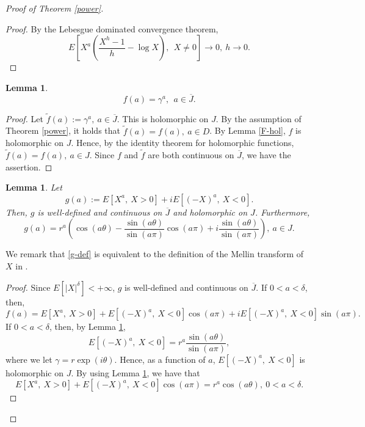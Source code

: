 \documentclass[a4paper, reqno, 11pt]{amsart}
\newtheorem{Lem}[Thm]{Lemma}
\theoremstyle{definition}
\begin{document}
\begin{proof}[Proof of Theorem \ref{power}]
\begin{proof}
By the Lebesgue dominated convergence theorem, %
\[ E\left[X^a \left( \frac{X^h - 1}{h} - \log X \right), \ \  X \ne 0 \right] \to 0, \ h \to 0. \]
\end{proof}

\begin{Lem}\label{F-rep}
\[ f(a) = \gamma^a, \  \ a \in \overline{J}. \]
\end{Lem}

\begin{proof}  
Let $\widetilde f(a) := \gamma^a, \ a \in \overline{J}$. 
This is holomorphic on $J$. 
By the assumption of Theorem \ref{power}, 
it holds that 
$\widetilde f(a) = f(a), \  a \in D$.  
By Lemma \ref{F-hol}, $f$ is holomorphic on $J$. 
Hence, by the identity theorem for holomorphic functions,  
$\widetilde f(a) = f(a), \  a \in J$. 
Since $f$ and $\widetilde f$ are both continuous on $\overline{J}$, 
we have the assertion. 
\end{proof}

\begin{Lem}\label{g-exp-pre}
Let 
\begin{equation}\label{g-def}
g(a) := E\left[X^a, \ X > 0 \right] + i E\left[(-X)^a, \ X < 0 \right].
\end{equation} 
Then,  $g$ is well-defined and continuous on $\overline{J}$ and holomorphic on $J$. 
Furthermore, 
\begin{equation}\label{g-strip} 
g(a) = r^a \left(\cos(a \theta) - \frac{\sin(a\theta)}{\sin(a\pi)} \cos(a\pi) + i \frac{\sin(a\theta)}{\sin(a\pi)} \right), \ a \in J. 
\end{equation}
\end{Lem}

We remark that \eqref{g-def} is equivalent to the definition of  the Mellin transform of $X$ in \cite[Section 1.3]{galambos2004}. %

\begin{proof}
Since $E[|X|^{\delta}] < +\infty$, 
$g$ is well-defined and continuous on $\overline{J}$.  
If $0 < a < \delta$, then, %
\begin{equation}\label{f-re-im} 
f(a) = E\left[X^a, \ X > 0 \right] + E\left[(-X)^a, \ X < 0 \right] \cos(a \pi) +  i E\left[(-X)^a, \ X < 0 \right] \sin(a \pi).  
\end{equation}
If $0 < a < \delta$, then, by Lemma \ref{F-rep}, %
\begin{equation}\label{x-nega} 
E\left[(-X)^a, \ X < 0 \right] = r^a \frac{\sin(a\theta)}{\sin(a\pi)},  
\end{equation}
where we let $\gamma = r \exp(i \theta)$.  
Hence, as a function of $a$, 
$E\left[(-X)^a, \ X < 0 \right]$ is holomorphic on $J$. 
By using  Lemma \ref{F-rep}, we have that 
\[ E\left[X^a, \ X > 0 \right] + E\left[(-X)^a, \ X < 0 \right] \cos(a \pi) = r^a \cos(a\theta), \ 0 < a < \delta. \]%



\end{proof}
\end{proof}
\end{document}
